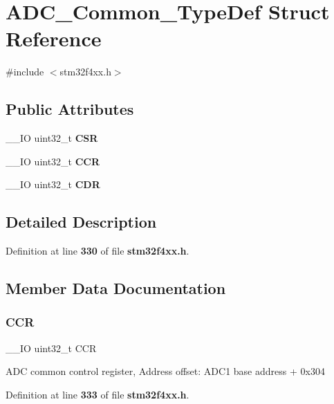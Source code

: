 \section{A\+D\+C\+\_\+\+Common\+\_\+\+Type\+Def Struct Reference}
\label{structADC__Common__TypeDef}


{\ttfamily \#include $<$stm32f4xx.\+h$>$}

\subsection*{Public Attributes}
\begin{DoxyCompactItemize}
\item 
\+\_\+\+\_\+\+IO uint32\+\_\+t \textbf{ C\+SR}
\item 
\+\_\+\+\_\+\+IO uint32\+\_\+t \textbf{ C\+CR}
\item 
\+\_\+\+\_\+\+IO uint32\+\_\+t \textbf{ C\+DR}
\end{DoxyCompactItemize}


\subsection{Detailed Description}


Definition at line \textbf{ 330} of file \textbf{ stm32f4xx.\+h}.



\subsection{Member Data Documentation}
\mbox{\label{structADC__Common__TypeDef_a5e1322e27c40bf91d172f9673f205c97}} 
\subsubsection{C\+CR}
{\footnotesize\ttfamily \+\_\+\+\_\+\+IO uint32\+\_\+t C\+CR}

A\+DC common control register, Address offset\+: A\+D\+C1 base address + 0x304 

Definition at line \textbf{ 333} of file \textbf{ stm32f4xx.\+h}.

\mbox{\label{structADC__Common__TypeDef_a760f86a1a18dffffda54fc15a977979f}} 
